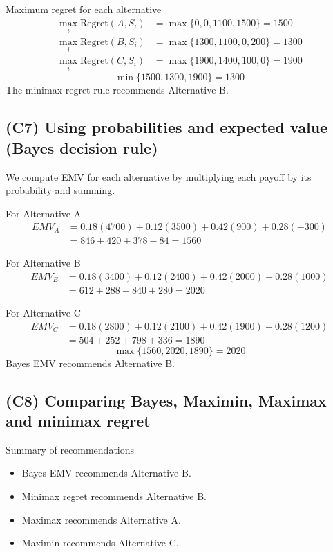 Maximum regret for each alternative
\[
\begin{aligned}
\max_i \text{Regret}(A, S_i) &= \max\{0, 0, 1100, 1500\} = 1500\\
\max_i \text{Regret}(B, S_i) &= \max\{1300, 1100, 0, 200\} = 1300\\
\max_i \text{Regret}(C, S_i) &= \max\{1900, 1400, 100, 0\} = 1900
\end{aligned}
\]
\[
\min\{1500, 1300, 1900\} = 1300
\]
The minimax regret rule recommends Alternative B.

\subsection{(C7) Using probabilities and expected value (Bayes decision rule)}\label{subsubsec:example2-1-c7}

We compute EMV for each alternative by multiplying each payoff by its probability and summing.

For Alternative A
\[
\begin{aligned}
EMV_A &= 0.18(4700) + 0.12(3500) + 0.42(900) + 0.28(-300)\\
&= 846 + 420 + 378 - 84 = 1560
\end{aligned}
\]

For Alternative B
\[
\begin{aligned}
EMV_B &= 0.18(3400) + 0.12(2400) + 0.42(2000) + 0.28(1000)\\
&= 612 + 288 + 840 + 280 = 2020
\end{aligned}
\]

For Alternative C
\[
\begin{aligned}
EMV_C &= 0.18(2800) + 0.12(2100) + 0.42(1900) + 0.28(1200)\\
&= 504 + 252 + 798 + 336 = 1890
\end{aligned}
\]
\[
\max\{1560, 2020, 1890\} = 2020
\]
Bayes EMV recommends Alternative B.

\subsection{(C8) Comparing Bayes, Maximin, Maximax and minimax regret}\label{subsubsec:example2-1-c8}

Summary of recommendations

\begin{itemize}
	\item Bayes EMV recommends Alternative B.
	\item Minimax regret recommends Alternative B.
	\item Maximax recommends Alternative A.
	\item Maximin recommends Alternative C.
\end{itemize}

